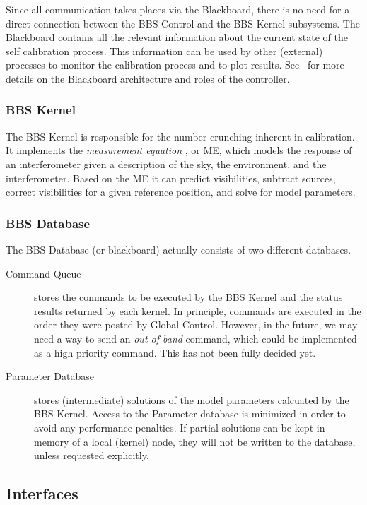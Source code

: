 \documentclass[10pt]{lofar}
\newcommand{\me}{ME\xspace}
\begin{document}
Since all communication takes places via the Blackboard, there is no need for
a direct connection between the BBS Control and the BBS Kernel subsystems.
The Blackboard contains all the relevant information about the current state
of the self calibration process. This information can be used by other
(external) processes to monitor the calibration process and to plot results.
See~\cite{LOFAR-ASTRON-SDD-002} for more details on the Blackboard
architecture and roles of the controller.


\subsubsection{BBS Kernel}
\label{subsubsec:sys-kernel}

The BBS Kernel is responsible for the number crunching inherent in calibration.
It implements the \emph{measurement equation} \cite{Hamaker1995, aips++note185},
or \me, which models the response of an interferometer given a description of
the sky, the environment, and the interferometer. Based on the \me it can
predict visibilities, subtract sources, correct visibilities for a given
reference position, and solve for model parameters.

\subsubsection{BBS Database}
\label{subsubsec:sys-database}
The BBS Database (or blackboard) actually consists of two different databases.
\begin{description}

\item [Command Queue] stores the commands to be executed by the BBS Kernel and
the status results returned by each kernel. In principle, commands are
executed in the order they were posted by Global Control. However, in the
future, we may need a way to send an \emph{out-of-band} command, which could
be implemented as a high priority command. This has not been fully decided
yet.
\item [Parameter Database] stores (intermediate) solutions of the model
parameters calcuated by the BBS Kernel. Access to the Parameter database is
minimized in order to avoid any performance penalties. If partial solutions
can be kept in memory of a local (kernel) node, they will not be written to
the database, unless requested explicitly.
\end{description}

\subsection{Interfaces}
\label{subsec:sys-interfaces}
\end{document}
